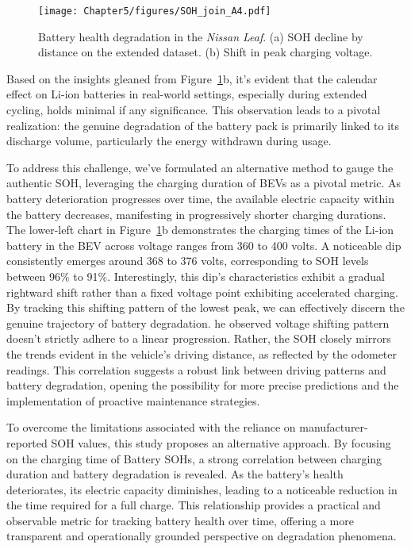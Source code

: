 \begin{figure}[ht]
    \centering
    \texttt{[image: Chapter5/figures/SOH\_join\_A4.pdf]}
    \caption{Battery health degradation in the \textit{Nissan Leaf}. (a) SOH decline by distance on the extended dataset. (b) Shift in peak charging voltage.}
    \label{fig:soh_odometer_charging_idling}
\end{figure}

Based on the insights gleaned from Figure~\ref{fig:soh_odometer_charging_idling}b, it's evident that the calendar effect on Li-ion batteries in real-world settings, especially during extended cycling, holds minimal if any significance. 
This observation leads to a pivotal realization: the genuine degradation of the battery pack is primarily linked to its discharge volume, particularly the energy withdrawn during usage.

To address this challenge, we've formulated an alternative method to gauge the authentic \gls{SOH}, leveraging the charging duration of \glspl{BEV} as a pivotal metric. 
As battery deterioration progresses over time, the available electric capacity within the battery decreases, manifesting in progressively shorter charging durations. 
The lower-left chart in Figure~\ref{fig:soh_odometer_charging_idling}b demonstrates the charging times of the Li-ion battery in the BEV across voltage ranges from 360 to 400 volts. 
A noticeable dip consistently emerges around 368 to 376 volts, corresponding to \gls{SOH} levels between 96\% to 91\%. 
Interestingly, this dip's characteristics exhibit a gradual rightward shift rather than a fixed voltage point exhibiting accelerated charging. 
By tracking this shifting pattern of the lowest peak, we can effectively discern the genuine trajectory of battery degradation. 
he observed voltage shifting pattern doesn't strictly adhere to a linear progression. 
Rather, the \gls{SOH} closely mirrors the trends evident in the vehicle's driving distance, as reflected by the odometer readings. 
This correlation suggests a robust link between driving patterns and battery degradation, opening the possibility for more precise predictions and the implementation of proactive maintenance strategies.

To overcome the limitations associated with the reliance on manufacturer-reported \gls{SOH} values, this study proposes an alternative approach. 
By focusing on the charging time of Battery \glspl{SOH}, a strong correlation between charging duration and battery degradation is revealed. 
As the battery's health deteriorates, its electric capacity diminishes, leading to a noticeable reduction in the time required for a full charge. 
This relationship provides a practical and observable metric for tracking battery health over time, offering a more transparent and operationally grounded perspective on degradation phenomena.

